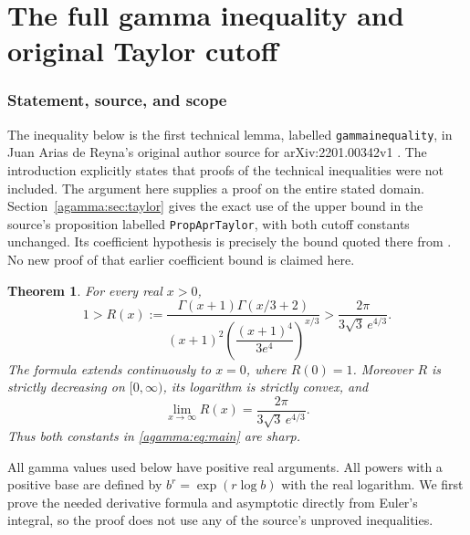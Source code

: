 

\clearpage\begingroup
\part*{The full gamma inequality and original Taylor cutoff}
\newtheorem{agammatheorem}{Theorem}
\newtheorem{agammalemma}[agammatheorem]{Lemma}
\newtheorem{agammaproposition}[agammatheorem]{Proposition}
\newtheorem{agammacorollary}[agammatheorem]{Corollary}
\newcommand{\agammaR}{\mathbb R}
\newcommand{\agammaN}{\mathbb N}
\newcommand{\agammaeps}{\varepsilon}



\section{Statement, source, and scope}\label{agamma:sec:scope}
The inequality below is the first technical lemma, labelled
\texttt{gammainequality}, in Juan Arias de Reyna's original author source
for arXiv:2201.00342v1 \cite[Section 3.10]{agamma:AriasII}. The introduction
explicitly states that proofs of the technical inequalities were not
included. The argument here supplies a proof on the entire stated
domain. Section~\ref{agamma:sec:taylor} gives the exact use of the upper bound
in the source's proposition labelled \texttt{PropAprTaylor}, with both
cutoff constants unchanged. Its coefficient hypothesis is precisely
the bound quoted there from \cite[formulas (47) and (56)]{agamma:AriasI}.
No new proof of that earlier coefficient bound is claimed here.

\begin{agammatheorem}\label{agamma:thm:gamma}
For every real $x>0$,
\begin{equation}\label{agamma:eq:main}
1>
R(x):=\frac{\Gamma(x+1)\Gamma(x/3+2)}
{(x+1)^2\left(\dfrac{(x+1)^4}{3e^4}\right)^{x/3}}
>\frac{2\pi}{3\sqrt3\,e^{4/3}}.
\end{equation}
The formula extends continuously to $x=0$, where $R(0)=1$.
Moreover $R$ is strictly decreasing on $[0,\infty)$, its logarithm
is strictly convex, and
\begin{equation}\label{agamma:eq:Rlimit}
\lim_{x\to\infty}R(x)=\frac{2\pi}{3\sqrt3\,e^{4/3}}.
\end{equation}
Thus both constants in \eqref{agamma:eq:main} are sharp.
\end{agammatheorem}

All gamma values used below have positive real arguments. All powers
with a positive base are defined by $b^r=\exp(r\log b)$ with the real
logarithm. We first prove the needed derivative formula and asymptotic
directly from Euler's integral, so the proof does not use any of the
source's unproved inequalities.

